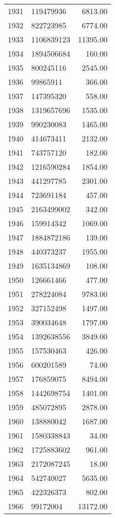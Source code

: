 \begin{table}[ht]
\begin{tabular}{rlr}
  1931 & 119479936 & 6813.00 \\ 
  1932 & 822723985 & 6774.00 \\ 
  1933 & 1106839123 & 11395.00 \\ 
  1934 & 1894506684 & 160.00 \\ 
  1935 & 800245116 & 2545.00 \\ 
  1936 & 99865911 & 366.00 \\ 
  1937 & 147395320 & 558.00 \\ 
  1938 & 1319657696 & 1535.00 \\ 
  1939 & 990230083 & 1465.00 \\ 
  1940 & 414673411 & 2132.00 \\ 
  1941 & 743757120 & 182.00 \\ 
  1942 & 1216590284 & 1854.00 \\ 
  1943 & 441297785 & 2301.00 \\ 
  1944 & 723691184 & 457.00 \\ 
  1945 & 2163499002 & 342.00 \\ 
  1946 & 159914342 & 1069.00 \\ 
  1947 & 1884872186 & 139.00 \\ 
  1948 & 440373237 & 1955.00 \\ 
  1949 & 1635134869 & 108.00 \\ 
  1950 & 126661466 & 477.00 \\ 
  1951 & 278224084 & 9783.00 \\ 
  1952 & 327152498 & 1497.00 \\ 
  1953 & 390034648 & 1797.00 \\ 
  1954 & 1392638556 & 3849.00 \\ 
  1955 & 157530463 & 426.00 \\ 
  1956 & 600201589 & 74.00 \\ 
  1957 & 176859075 & 8494.00 \\ 
  1958 & 1442698754 & 1401.00 \\ 
  1959 & 485072895 & 2878.00 \\ 
  1960 & 138880042 & 1687.00 \\ 
  1961 & 1580338843 & 34.00 \\ 
  1962 & 1725883602 & 961.00 \\ 
  1963 & 2172087245 & 18.00 \\ 
  1964 & 542740027 & 5635.00 \\ 
  1965 & 422326373 & 802.00 \\ 
  1966 & 99172004 & 13172.00 \\ 

\end{tabular}
\end{table}
